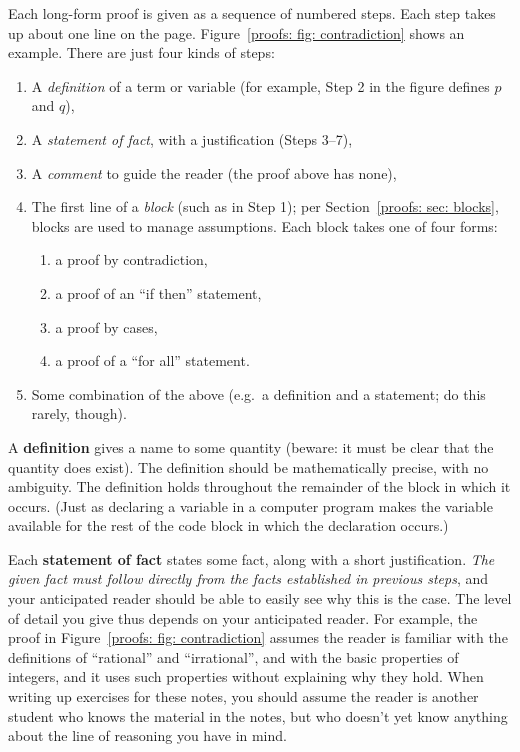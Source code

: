 Each long-form proof is given as a sequence of numbered steps.
Each step takes up about one line on the page.  Figure~\ref{proofs: fig: contradiction} shows an example. 
There are just four kinds of steps:
\begin{enumerate}[itemsep=0pt]
\item A \emph{definition} of a term or variable (for example, Step 2 in the figure defines $p$ and $q$),
\item A \emph{statement of fact}, with a justification (Steps 3--7), 
\item A \emph{comment} to guide the reader (the proof above has none),
\item The first line of a \emph{block} (such as in Step 1); per Section~\ref{proofs: sec: blocks},
  blocks are used to manage assumptions.   Each block takes one of four forms:
  \begin{enumerate}[label=(\roman*)]
  \item a proof by contradiction,
  \item a proof of an ``if then'' statement,
  \item a proof by cases,
  \item a proof of a ``for all'' statement.
  \end{enumerate}
\item Some combination of the above (e.g.~a definition and a statement; do this rarely, though).
\end{enumerate}

A \textbf{definition} gives a name to some quantity (beware: it must be clear that the quantity does exist).
The definition should be mathematically precise, with no ambiguity.
The definition holds throughout the remainder of the block in which it occurs.
(Just as declaring a variable in a computer program makes the variable available
for the rest of the code block in which the declaration occurs.)

Each \textbf{statement of fact} states some fact, along with a short justification.
\emph{The given fact must follow directly from the facts established in previous steps},
and your anticipated reader should be able to easily see why this is the case.
The level of detail you give thus depends on your anticipated reader.
For example, the proof in Figure~\ref{proofs: fig: contradiction} assumes the reader is familiar with the definitions of ``rational''
and ``irrational'', and with the basic properties of integers,
and it uses such properties without explaining why they hold.
When writing up exercises for these notes, you should assume the reader is another student
who knows the material in the notes,
but who doesn't yet know anything about the line of reasoning you have in mind.

